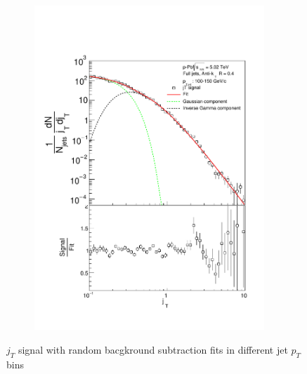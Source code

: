 \begin{figure}
\begin{subfigure}{0.24\textwidth}
\includegraphics[width=0.95\textwidth]{results/JetConejTSignalFit/JetConejTSignalFitNFin00JetPt07randomBgBayes}
\end{subfigure}
\caption{$j_T$ signal with random bacgkround subtraction fits in different jet $p_T$ bins}
\label{fig:fitsrandombg}
\end{figure}

